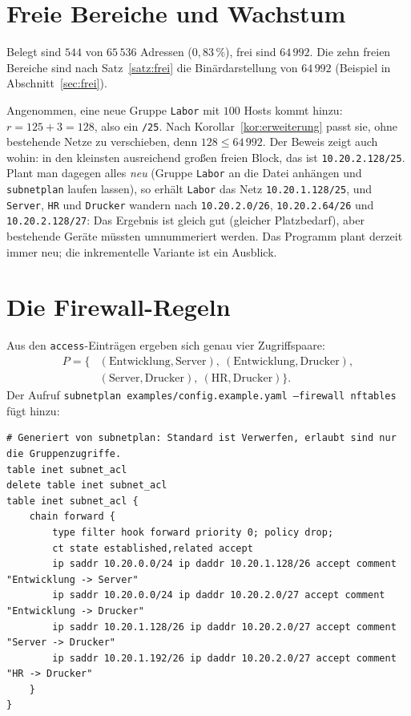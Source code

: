 \documentclass[a4paper,12pt, twoside]{report}
\theoremstyle{definition}
\begin{document}
\section{Freie Bereiche und Wachstum}

Belegt sind $544$ von $65\,536$ Adressen ($0{,}83\,\%$), frei sind $64\,992$. Die zehn freien Bereiche sind nach Satz~\ref{satz:frei} die Binärdarstellung von $64\,992$ (Beispiel in Abschnitt~\ref{sec:frei}).

Angenommen, eine neue Gruppe \texttt{Labor} mit $100$ Hosts kommt hinzu: $r = 125 + 3 = 128$, also ein \texttt{/25}. Nach Korollar~\ref{kor:erweiterung} passt sie, ohne bestehende Netze zu verschieben, denn $128 \le 64\,992$. Der Beweis zeigt auch wohin: in den kleinsten ausreichend großen freien Block, das ist \texttt{10.20.2.128/25}. Plant man dagegen alles \emph{neu} (Gruppe \texttt{Labor} an die Datei anhängen und \texttt{subnetplan} laufen lassen), so erhält \texttt{Labor} das Netz \texttt{10.20.1.128/25}, und \texttt{Server}, \texttt{HR} und \texttt{Drucker} wandern nach \texttt{10.20.2.0/26}, \texttt{10.20.2.64/26} und \texttt{10.20.2.128/27}: Das Ergebnis ist gleich gut (gleicher Platzbedarf), aber bestehende Geräte müssten umnummeriert werden. Das Programm plant derzeit immer neu; die inkrementelle Variante ist ein Ausblick.

\section{Die Firewall-Regeln}

Aus den \texttt{access}-Einträgen ergeben sich genau vier Zugriffspaare:
\begin{align*}
P = \{&(\text{Entwicklung},\text{Server}),\ (\text{Entwicklung},\text{Drucker}),\\
&(\text{Server},\text{Drucker}),\ (\text{HR},\text{Drucker})\}.
\end{align*}
Der Aufruf \texttt{subnetplan examples/config.example.yaml --firewall nftables} fügt hinzu:

\begin{lstlisting}[language={}, numbers=none, basicstyle=\ttfamily\scriptsize, caption={nftables-Regeln für das Beispiel}]
# Generiert von subnetplan: Standard ist Verwerfen, erlaubt sind nur die Gruppenzugriffe.
table inet subnet_acl
delete table inet subnet_acl
table inet subnet_acl {
    chain forward {
        type filter hook forward priority 0; policy drop;
        ct state established,related accept
        ip saddr 10.20.0.0/24 ip daddr 10.20.1.128/26 accept comment "Entwicklung -> Server"
        ip saddr 10.20.0.0/24 ip daddr 10.20.2.0/27 accept comment "Entwicklung -> Drucker"
        ip saddr 10.20.1.128/26 ip daddr 10.20.2.0/27 accept comment "Server -> Drucker"
        ip saddr 10.20.1.192/26 ip daddr 10.20.2.0/27 accept comment "HR -> Drucker"
    }
}
\end{lstlisting}
\end{document}
